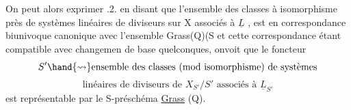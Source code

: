 
On peut alors exprimer .2. en disant que l'ensemble des classes
à isomorphisme près de systèmes linéaires de diviseurs sur X associés à
$\underline{L}$ , est en correspondance biunivoque canonique avec l'ensemble 
Grass(Q)(S et cette correspondance étant compatible avec  changemen
de base quelconques, onvoit que le foncteur
\[ S' \hand{\rightsquigarrow} \text{ensemble des classes (mod isomorphisme) de systèmes} \]
\[ \text{linéaires de diviseurs de } X_{S'}/S' \text{ associés à } \underline{L}_{S'} \]
est représentable par le S-préschéma \uline{Grass} (Q).

